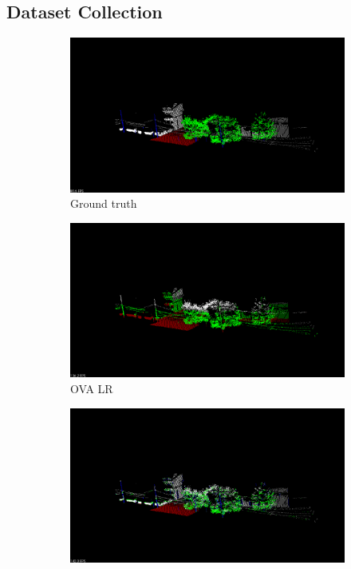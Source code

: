 \documentclass[a4paper]{article}
\begin{document}
\subsection{Dataset Collection}
\begin{figure}[!htp]
  \centering
  \begin{subfigure}[b]{.3\linewidth}
    \includegraphics[width=\textwidth]{ground_truth_test.png}
        \caption{Ground truth}
  \end{subfigure} \quad
  \begin{subfigure}[b]{.3\linewidth}
    \includegraphics[width=\textwidth]{logistic_test.png}
        \caption{OVA LR}
  \end{subfigure}\quad
  \begin{subfigure}[b]{.3\linewidth}
    \includegraphics[width=\textwidth]{multilog_test.png}

\end{subfigure}
\end{figure}
\end{document}
